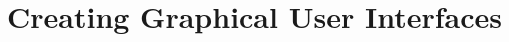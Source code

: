 \chapter{Creating Graphical User Interfaces}


\begin{exercises}

\begin{ex} %
\end{ex}

\begin{ex} %
\end{ex}

\begin{ex} %
\end{ex}

\begin{ex} %
\end{ex}

\end{exercises}

